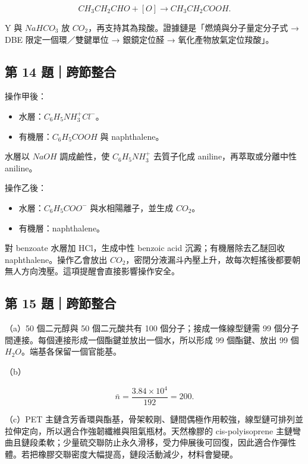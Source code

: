 \documentclass[11pt,a4paper]{article}
\providecommand{\tightlist}{%
  \setlength{\itemsep}{0pt}\setlength{\parskip}{0pt}}
\begin{document}
\[
CH_3CH_2CHO+[O]\rightarrow CH_3CH_2COOH.
\]

Y 與 \(NaHCO_3\) 放 \(CO_2\)，再支持其為羧酸。證據鏈是「燃燒與分子量定分子式 → DBE 限定一個環／雙鍵單位 → 銀鏡定位醛 → 氧化產物放氣定位羧酸」。

\subsection{第 14 題｜跨節整合}\label{ux7b2c-14-ux984cux8de8ux7bc0ux6574ux5408}

操作甲後：

\begin{itemize}
\tightlist
\item
  水層：\(C_6H_5NH_3^+Cl^-\)。
\item
  有機層：\(C_6H_5COOH\) 與 naphthalene。
\end{itemize}

水層以 \(NaOH\) 調成鹼性，使 \(C_6H_5NH_3^+\) 去質子化成 aniline，再萃取或分離中性 aniline。

操作乙後：

\begin{itemize}
\tightlist
\item
  水層：\(C_6H_5COO^-\) 與水相陽離子，並生成 \(CO_2\)。
\item
  有機層：naphthalene。
\end{itemize}

對 benzoate 水層加 HCl，生成中性 benzoic acid 沉澱；有機層除去乙醚回收 naphthalene。操作乙會放出 \(CO_2\)，密閉分液漏斗內壓上升，故每次輕搖後都要朝無人方向洩壓。這項提醒會直接影響操作安全。

\subsection{第 15 題｜跨節整合}\label{ux7b2c-15-ux984cux8de8ux7bc0ux6574ux5408}

（a）50 個二元醇與 50 個二元酸共有 100 個分子；接成一條線型鏈需 99 個分子間連接。每個連接形成一個酯鍵並放出一個水，所以形成 99 個酯鍵、放出 99 個 \(H_2O\)。端基各保留一個官能基。

（b）

\[
\bar n=\frac{3.84\times10^4}{192}=200.
\]

（c）PET 主鏈含芳香環與酯基，骨架較剛、鏈間偶極作用較強，線型鏈可排列並拉伸定向，所以適合作強韌纖維與阻氣瓶材。天然橡膠的 cis-polyisoprene 主鏈彎曲且鏈段柔軟；少量硫交聯防止永久滑移，受力伸展後可回復，因此適合作彈性體。若把橡膠交聯密度大幅提高，鏈段活動減少，材料會變硬。
\end{document}
